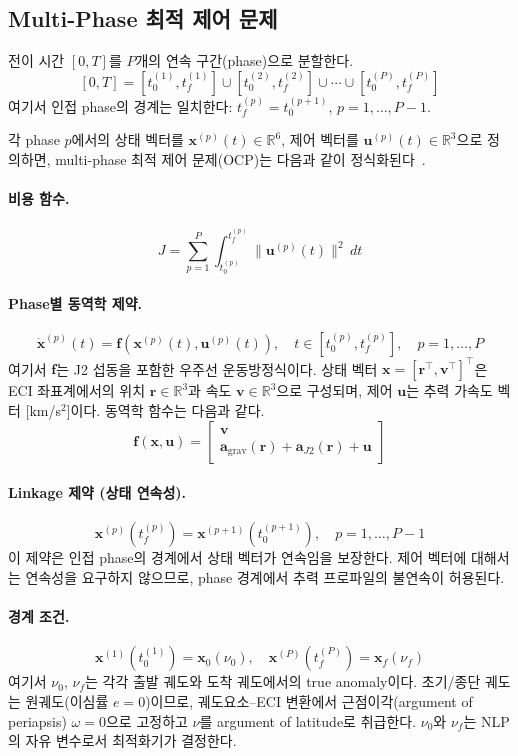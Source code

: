 \documentclass[11pt]{article}
\begin{document}
\subsection{Multi-Phase 최적 제어 문제}
\label{sec:multiphase_ocp}

전이 시간 $[0, T]$를 $P$개의 연속 구간(phase)으로 분할한다.
\[
[0, T] = [t_0^{(1)}, t_f^{(1)}] \cup [t_0^{(2)}, t_f^{(2)}] \cup \cdots \cup [t_0^{(P)}, t_f^{(P)}]
\]
여기서 인접 phase의 경계는 일치한다: $t_f^{(p)} = t_0^{(p+1)}$, $p = 1, \ldots, P-1$.

각 phase $p$에서의 상태 벡터를 $\mathbf{x}^{(p)}(t) \in \mathbb{R}^6$, 제어 벡터를 $\mathbf{u}^{(p)}(t) \in \mathbb{R}^3$으로 정의하면, multi-phase 최적 제어 문제(OCP)는 다음과 같이 정식화된다~\cite{Betts1998}.

\paragraph{비용 함수.}
\[
J = \sum_{p=1}^{P} \int_{t_0^{(p)}}^{t_f^{(p)}} \|\mathbf{u}^{(p)}(t)\|^2 \, dt
\]

\paragraph{Phase별 동역학 제약.}
\[
\dot{\mathbf{x}}^{(p)}(t) = \mathbf{f}(\mathbf{x}^{(p)}(t), \mathbf{u}^{(p)}(t)), \quad t \in [t_0^{(p)}, t_f^{(p)}], \quad p = 1, \ldots, P
\]
여기서 $\mathbf{f}$는 J2 섭동을 포함한 우주선 운동방정식이다.
상태 벡터 $\mathbf{x} = [\mathbf{r}^\top, \mathbf{v}^\top]^\top$은 ECI 좌표계에서의 위치 $\mathbf{r} \in \mathbb{R}^3$과 속도 $\mathbf{v} \in \mathbb{R}^3$으로 구성되며, 제어 $\mathbf{u}$는 추력 가속도 벡터 [km/s$^2$]이다.
동역학 함수는 다음과 같다.
\[
\mathbf{f}(\mathbf{x}, \mathbf{u}) = \begin{bmatrix} \mathbf{v} \\ \mathbf{a}_\text{grav}(\mathbf{r}) + \mathbf{a}_{J2}(\mathbf{r}) + \mathbf{u} \end{bmatrix}
\]

\paragraph{Linkage 제약 (상태 연속성).}
\[
\mathbf{x}^{(p)}(t_f^{(p)}) = \mathbf{x}^{(p+1)}(t_0^{(p+1)}), \quad p = 1, \ldots, P-1
\]
이 제약은 인접 phase의 경계에서 상태 벡터가 연속임을 보장한다.
제어 벡터에 대해서는 연속성을 요구하지 않으므로, phase 경계에서 추력 프로파일의 불연속이 허용된다.

\paragraph{경계 조건.}
\[
\mathbf{x}^{(1)}(t_0^{(1)}) = \mathbf{x}_0(\nu_0), \quad \mathbf{x}^{(P)}(t_f^{(P)}) = \mathbf{x}_f(\nu_f)
\]
여기서 $\nu_0$, $\nu_f$는 각각 출발 궤도와 도착 궤도에서의 true anomaly이다.
초기/종단 궤도는 원궤도(이심률 $e = 0$)이므로, 궤도요소--ECI 변환에서 근점이각(argument of periapsis) $\omega = 0$으로 고정하고 $\nu$를 argument of latitude로 취급한다.
$\nu_0$와 $\nu_f$는 NLP의 자유 변수로서 최적화기가 결정한다.
\end{document}
